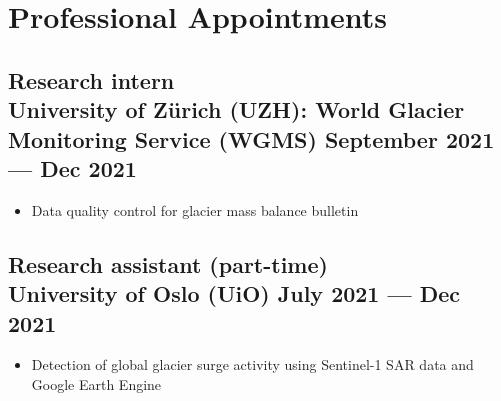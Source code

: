 \documentclass[a4,10pt]{article}
\newenvironment{zitemize}{
\begin{itemize}\itemsep2pt \parskip0pt \parsep1pt}
{\end{itemize}\vspace{-0.5cm}}
\begin{document}
\section{Professional Appointments} %


\subsection*{Research intern \\ University of Zürich (UZH): World Glacier Monitoring Service (WGMS) \hfill September 2021 --- Dec 2021} 
    \begin{zitemize}
        \item Data quality control for glacier mass balance bulletin 
 
    \end{zitemize}

\subsection*{Research assistant (part-time) \\University of Oslo (UiO) \hfill July 2021 --- Dec 2021} 
    \begin{zitemize}
        \item Detection of global glacier surge activity using Sentinel-1 SAR data and Google Earth Engine 
    \end{zitemize}


\end{document}
